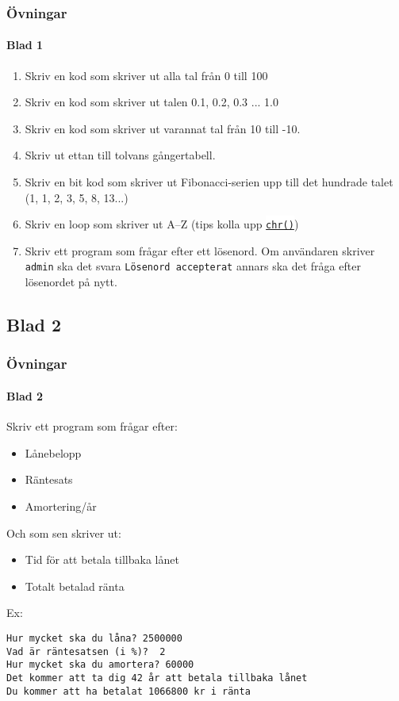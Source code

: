 \documentclass[aspectratio=169]{beamer}
\newcommand{\code}[1]{\colorbox{white}{\lstinline{#1}}}
\begin{document}
\begin{frame}
	\frametitle{Övningar}
	\framesubtitle{Blad 1}
	
	\begin{enumerate}
		\item Skriv en kod som skriver ut alla tal från 0 till 100
		\item Skriv en kod som skriver ut talen 0.1, 0.2, 0.3 ... 1.0
		\item Skriv en kod som skriver ut varannat tal från 10 till -10.
		\item Skriv ut ettan till tolvans gångertabell.
		\item Skriv en bit kod som skriver ut Fibonacci-serien upp till det hundrade talet (1, 1, 2, 3, 5, 8, 13...)
		\item Skriv en loop som skriver ut A--Z (tips kolla upp \href{https://docs.python.org/3/library/functions.html\#chr}{\code{chr()}})
		\item Skriv ett program som frågar efter ett lösenord. Om användaren skriver \texttt{admin} ska det svara \texttt{Lösenord accepterat} annars ska det fråga efter lösenordet på nytt.
	\end{enumerate}

\end{frame}

\subsection{Blad 2}

\begin{frame}[fragile]
	\frametitle{Övningar}
	\framesubtitle{Blad 2}
	
	Skriv ett program som frågar efter:
	
	\begin{itemize}
		\item Lånebelopp
		\item Räntesats
		\item Amortering/år
	\end{itemize}
	
	Och som sen skriver ut:
	
	\begin{itemize}
		\item Tid för att betala tillbaka lånet
		\item Totalt betalad ränta
	\end{itemize}
	
	Ex:
	
	\begin{lstlisting}
Hur mycket ska du låna? 2500000
Vad är räntesatsen (i %)?  2
Hur mycket ska du amortera? 60000
Det kommer att ta dig 42 år att betala tillbaka lånet
Du kommer att ha betalat 1066800 kr i ränta
	\end{lstlisting}
	
	
\end{frame}
\end{document}
